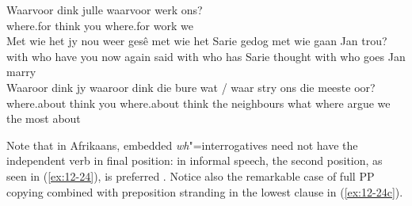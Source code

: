 \documentclass[output=paper]{langsci/langscibook}
\begin{document}
\begin{exe}
\ex
\label{ex:12-24}
\begin{xlist}
\ex
\label{ex:12-24a}
\gll
Waarvoor dink julle waarvoor werk ons? \\
where.for think you where.for work we \\
\ex
\label{ex:12-24b}
\gll
Met wie het jy nou weer ges\^e met wie het Sarie gedog met
        wie gaan Jan trou?\\
with who have you now again said with who has Sarie thought with who goes Jan marry \\
\ex
\label{ex:12-24c}
\gll
Waaroor dink jy waaroor dink die bure wat / waar stry ons
        die meeste oor? \\
where.about think you where.about think the neighbours what {} where argue we
     the most about \\
\end{xlist}
\end{exe}
Note that in Afrikaans, embedded \emph{wh}"=interrogatives need not have the
independent verb in final position: in informal speech, the second position,
as seen in (\ref{ex:12-24}), is preferred \citep[530]{Ponelis1979}. Notice also the
remarkable case of full PP copying combined with preposition stranding in the
lowest clause in (\ref{ex:12-24c}).
\end{document}
